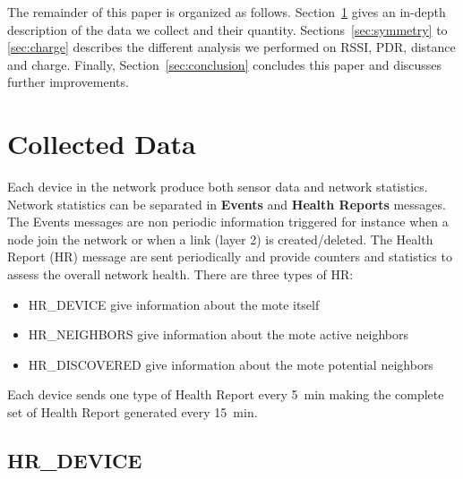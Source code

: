 \documentclass{sig-alternate}
\begin{document}

The remainder of this paper is organized as follows.
Section~\ref{sec:collected} gives an in-depth description of the data we collect and their quantity.
Sections~\ref{sec:symmetry} to \ref{sec:charge} describes the different analysis we performed on RSSI, PDR, distance and charge.
Finally, Section~\ref{sec:conclusion} concludes this paper and discusses further improvements.

\section{Collected Data}
\label{sec:collected}


Each device in the network produce both sensor data and network statistics.
Network statistics can be separated in \textbf{Events} and \textbf{Health Reports} messages.
The Events messages are non periodic information triggered for instance when a node join the network or when a link (layer 2) is created/deleted.
The Health Report (HR) message are sent periodically and provide counters and statistics to assess the overall network health.
There are three types of HR:
\begin{itemize}
  \item HR\_DEVICE give information about the mote itself
  \item HR\_NEIGHBORS give information about the mote active neighbors
  \item HR\_DISCOVERED give information about the mote potential neighbors
\end{itemize}
Each device sends one type of Health Report every 5~min making the complete set of Health Report generated every 15~min.

\subsection{HR\_DEVICE}
\end{document}
